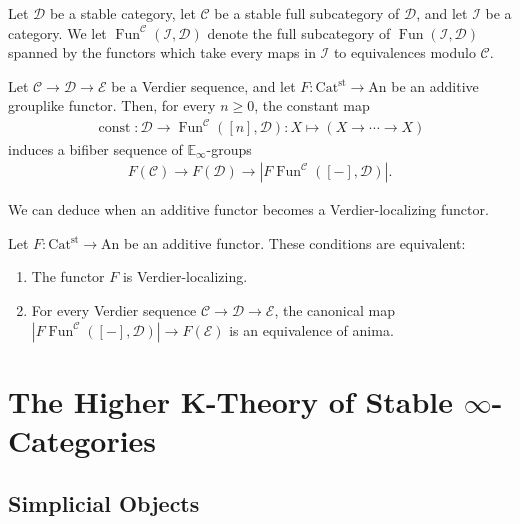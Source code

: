 \documentclass[a4paper,dvipdfmx,11pt,reqno]{amsart}
\DeclareMathOperator{\const}{const}
\DeclareMathOperator{\Fun}{Fun}
\newcommand{\C}{\mathcal{C}}
\newcommand{\D}{\mathcal{D}}
\newcommand{\E}{\mathcal{E}}
\newcommand{\I}{\mathcal{I}}
\newcommand{\An}{\mathrm{An}}
\newcommand{\Catst}{\mathrm{Cat^{st}}}
\newcommand{\Einf}{\mathbb{E}_{\infty}}
\begin{document}
\begin{notation}
  Let $\D$ be a stable category, let $\C$ be a stable full subcategory of $\D$, and let $\I$ be a category.
  We let $\Fun^{\C}(\I,\D)$ denote the full subcategory of $\Fun(\I,\D)$ spanned by the functors which take every maps in $\I$ to equivalences modulo $\C$.
\end{notation}

\begin{theorem} \label{thrm.Waldhausen_fibration_theorem}
  Let $\C \to \D \to \E$ be a Verdier sequence, and let $F : \Catst \to \An$ be an additive grouplike functor.
  Then, for every $n \geq 0$, the constant map 
  \begin{align*}
    \const : \D \to \Fun^{\C}([n],\D) : X \mapsto (X \to \cdots \to X)
  \end{align*}
  induces a bifiber sequence of $\Einf$-groups 
  \begin{align*}
    F(\C) \to F(\D) \to |F\Fun^{\C}([-],\D)|.
  \end{align*}
\end{theorem}

We can deduce when an additive functor becomes a Verdier-localizing functor.

\begin{corollary}
  Let $F : \Catst \to \An$ be an additive functor.
  These conditions are equivalent:
  \begin{enumerate}
    \item The functor $F$ is Verdier-localizing.
    \item For every Verdier sequence $\C \to \D \to \E$, the canonical map $|F\Fun^{\C}([-],\D)| \to F(\E)$ is an equivalence of anima.
  \end{enumerate}
\end{corollary}


\section{The Higher K-Theory of Stable \texorpdfstring{$\infty$}{infty}-Categories}

\subsection{Simplicial Objects}
\end{document}
